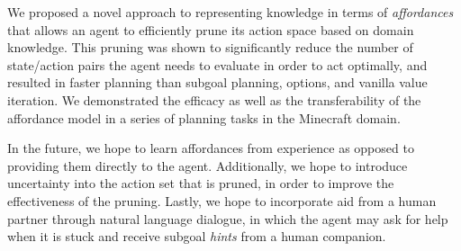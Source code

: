 \documentclass[]{article}
\begin{document}
We proposed a novel approach to representing knowledge in terms of
{\em affordances}~\citep{gibson77} that allows an agent to efficiently
prune its action space based on domain knowledge. This pruning was
shown to significantly reduce the number of state/action pairs the
agent needs to evaluate in order to act optimally, and resulted in
faster planning than subgoal planning, options, and vanilla value
iteration. We demonstrated the efficacy as well as the transferability
of the affordance model in a series of planning tasks in the Minecraft
domain.

In the future, we hope to learn affordances from experience as opposed
to providing them directly to the agent. Additionally, we hope to
introduce uncertainty into the action set that is pruned, in order to
improve the effectiveness of the pruning. Lastly, we hope to
incorporate aid from a human partner through natural language
dialogue, in which the agent may ask for help when it is stuck and
receive subgoal {\it hints} from a human companion.


  
\end{document}
